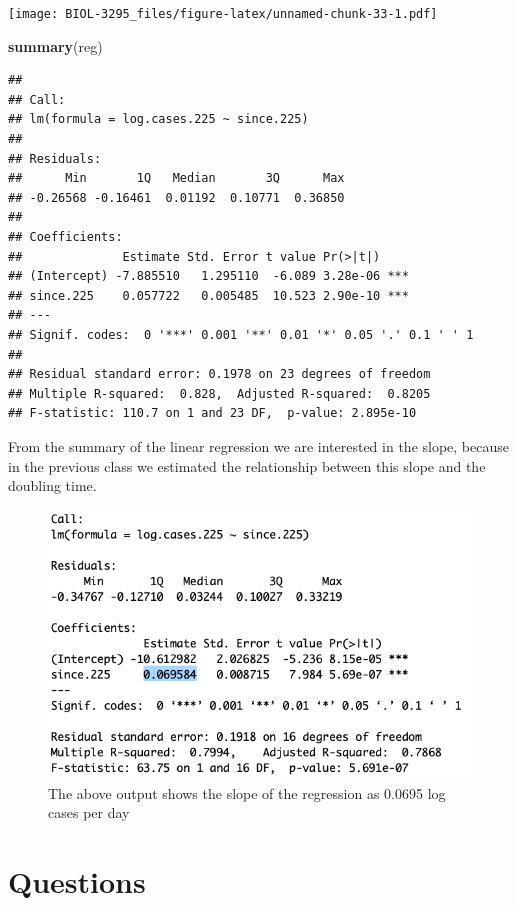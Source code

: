 \documentclass[]{book}
\newenvironment{Shaded}{\begin{snugshade}}{\end{snugshade}}
\newcommand{\KeywordTok}[1]{\textcolor[rgb]{0.13,0.29,0.53}{\textbf{{#1}}}}
\newcommand{\NormalTok}[1]{{#1}}
\begin{document}
\texttt{[image: BIOL-3295\_files/figure-latex/unnamed-chunk-33-1.pdf]}

\begin{Shaded}
\begin{Highlighting}[]
\KeywordTok{summary}\NormalTok{(reg)}
\end{Highlighting}
\end{Shaded}

\begin{verbatim}
## 
## Call:
## lm(formula = log.cases.225 ~ since.225)
## 
## Residuals:
##      Min       1Q   Median       3Q      Max 
## -0.26568 -0.16461  0.01192  0.10771  0.36850 
## 
## Coefficients:
##              Estimate Std. Error t value Pr(>|t|)    
## (Intercept) -7.885510   1.295110  -6.089 3.28e-06 ***
## since.225    0.057722   0.005485  10.523 2.90e-10 ***
## ---
## Signif. codes:  0 '***' 0.001 '**' 0.01 '*' 0.05 '.' 0.1 ' ' 1
## 
## Residual standard error: 0.1978 on 23 degrees of freedom
## Multiple R-squared:  0.828,  Adjusted R-squared:  0.8205 
## F-statistic: 110.7 on 1 and 23 DF,  p-value: 2.895e-10
\end{verbatim}

From the summary of the linear regression we are interested in the
slope, because in the previous class we estimated the relationship
between this slope and the doubling time.

\begin{figure}
\includegraphics[width=0.95\linewidth]{figures/regression} \caption{The above output shows the slope of the regression as 0.0695 log cases per day}\label{fig:regression}
\end{figure}

\section{Questions}\label{questions-7}
\end{document}
